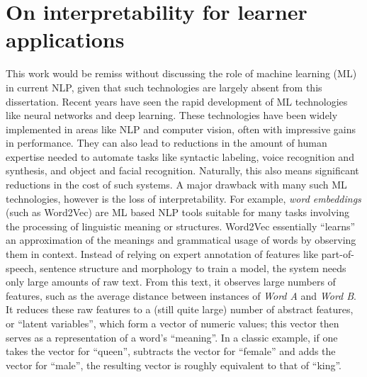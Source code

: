 \section{On interpretability for learner applications}
\label{section:ICALLinterp}
This work would be remiss without discussing the role of machine learning (ML) in current NLP, given that such technologies are largely absent from this dissertation. Recent years have seen the rapid development of ML technologies like neural networks and deep learning.  These technologies have been widely implemented in areas like NLP and computer vision, often with impressive gains in performance. They can also lead to reductions in the amount of human expertise needed to automate tasks like syntactic labeling, voice recognition and synthesis, and object and facial recognition.  Naturally, this also means significant reductions in the cost of such systems. A major drawback with many such ML technologies, however is the loss of interpretability. For example, \textit{word embeddings} (such as Word2Vec)  are ML based NLP tools suitable for many tasks involving the processing of linguistic meaning or structures. Word2Vec essentially ``learns'' an approximation of the meanings and grammatical usage of words by observing them in context. Instead of relying on expert annotation of features like part-of-speech, sentence structure and morphology to train a model, the system needs only large amounts of raw text. From this text, it observes large numbers of features, such as the average distance between instances of \textit{Word A} and \textit{Word B}. It reduces these raw features to a (still quite large) number of abstract features, or ``latent variables'', which form a vector of numeric values; this vector then serves as a representation of a word's ``meaning''. In a classic example, if one takes the vector for ``queen'', subtracts the vector for ``female'' and adds the vector for ``male'', the resulting vector is roughly equivalent to that of ``king''.

